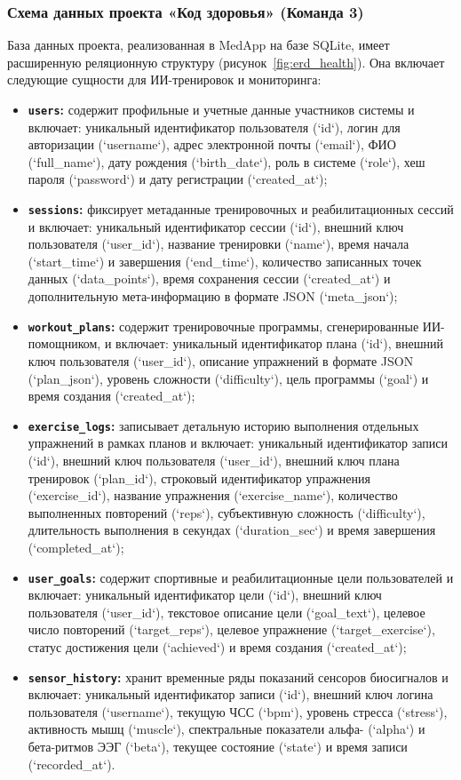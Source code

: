 \documentclass[utf8, russian]{eskdtext}
\begin{document}
\subsubsection{Схема данных проекта «Код здоровья» (Команда 3)}
База данных проекта, реализованная в MedApp на базе SQLite, имеет расширенную реляционную структуру (рисунок~\ref{fig:erd_health}). Она включает следующие сущности для ИИ-тренировок и мониторинга:
\begin{itemize}
    \item \textbf{\texttt{users}:} содержит профильные и учетные данные участников системы и включает: уникальный идентификатор пользователя (`id`), логин для авторизации (`username`), адрес электронной почты (`email`), ФИО (`full\_name`), дату рождения (`birth\_date`), роль в системе (`role`), хеш пароля (`password`) и дату регистрации (`created\_at`);
    \item \textbf{\texttt{sessions}:} фиксирует метаданные тренировочных и реабилитационных сессий и включает: уникальный идентификатор сессии (`id`), внешний ключ пользователя (`user\_id`), название тренировки (`name`), время начала (`start\_time`) и завершения (`end\_time`), количество записанных точек данных (`data\_points`), время сохранения сессии (`created\_at`) и дополнительную мета-информацию в формате JSON (`meta\_json`);
    \item \textbf{\texttt{workout\_plans}:} содержит тренировочные программы, сгенерированные ИИ-помощником, и включает: уникальный идентификатор плана (`id`), внешний ключ пользователя (`user\_id`), описание упражнений в формате JSON (`plan\_json`), уровень сложности (`difficulty`), цель программы (`goal`) и время создания (`created\_at`);
    \item \textbf{\texttt{exercise\_logs}:} записывает детальную историю выполнения отдельных упражнений в рамках планов и включает: уникальный идентификатор записи (`id`), внешний ключ пользователя (`user\_id`), внешний ключ плана тренировок (`plan\_id`), строковый идентификатор упражнения (`exercise\_id`), название упражнения (`exercise\_name`), количество выполненных повторений (`reps`), субъективную сложность (`difficulty`), длительность выполнения в секундах (`duration\_sec`) и время завершения (`completed\_at`);
    \item \textbf{\texttt{user\_goals}:} содержит спортивные и реабилитационные цели пользователей и включает: уникальный идентификатор цели (`id`), внешний ключ пользователя (`user\_id`), текстовое описание цели (`goal\_text`), целевое число повторений (`target\_reps`), целевое упражнение (`target\_exercise`), статус достижения цели (`achieved`) и время создания (`created\_at`);
    \item \textbf{\texttt{sensor\_history}:} хранит временные ряды показаний сенсоров биосигналов и включает: уникальный идентификатор записи (`id`), внешний ключ логина пользователя (`username`), текущую ЧСС (`bpm`), уровень стресса (`stress`), активность мышц (`muscle`), спектральные показатели альфа- (`alpha`) и бета-ритмов ЭЭГ (`beta`), текущее состояние (`state`) и время записи (`recorded\_at`).
\end{itemize}
\end{document}

